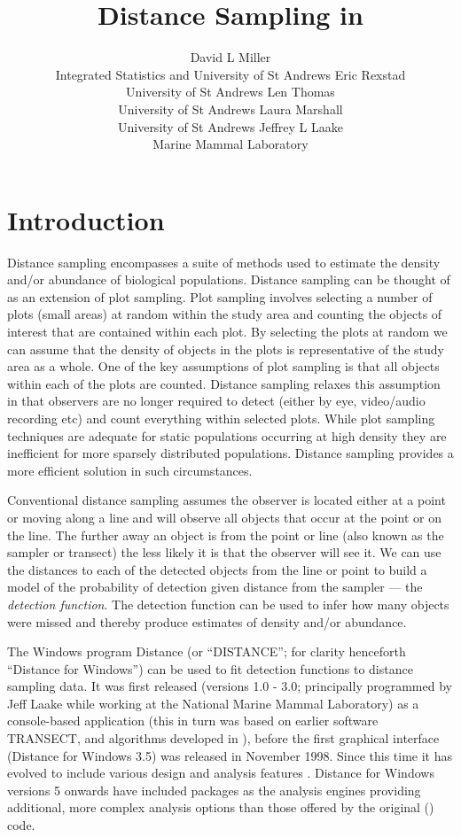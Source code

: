 \documentclass[article]{jss}\usepackage[]{graphicx}\usepackage[]{color}
\author{David L Miller\\Integrated Statistics and University of St Andrews \AND 
        Eric Rexstad\\University of St Andrews \And 
        Len Thomas\\University of St Andrews \AND 
        Laura Marshall\\University of St Andrews \And 
        Jeffrey L Laake\\Marine Mammal Laboratory}
\title{Distance Sampling in \proglang{R}}
\begin{document}
\section{Introduction}


Distance sampling \citep{Buckland:2001vm, Buckland:2004ts, buckland2015distance} encompasses a suite of methods used to estimate the density and/or abundance of biological populations. Distance sampling can be thought of as an extension of plot sampling. Plot sampling involves selecting a number of plots (small areas) at random within the study area and counting the objects of interest that are contained within each plot. By selecting the plots at random we can assume that the density of objects in the plots is representative of the study area as a whole. One of the key assumptions of plot sampling is that all objects within each of the plots are counted. Distance sampling relaxes this assumption in that observers are no longer required to detect (either by eye, video/audio recording etc) and count everything within selected plots. While plot sampling techniques are adequate for static populations occurring at high density they are inefficient for more sparsely distributed populations. Distance sampling provides a more efficient solution in such circumstances.

Conventional distance sampling assumes the observer is located either at a point or moving along a line and will observe all objects that occur at the point or on the line. The further away an object is from the point or line (also known as the sampler or transect) the less likely it is that the observer will see it. We can use the distances to each of the detected objects from the line or point to build a model of the probability of detection given distance from the sampler --- the \textit{detection function}. The detection function can be used to infer how many objects were missed and thereby produce estimates of density and/or abundance. 

The Windows program Distance (or ``DISTANCE''; for clarity henceforth ``Distance for Windows'') can be used to fit detection functions to distance sampling data. It was first released (versions 1.0 - 3.0; principally programmed by Jeff Laake while working at the National Marine Mammal Laboratory) as a console-based application (this in turn was based on earlier software TRANSECT, \citealp{Burnham:1980wz} and algorithms developed in \citealp{Buckland:1992fa}), before the first graphical interface (Distance for Windows 3.5) was released in November 1998. Since this time it has evolved to include various design and analysis features \citep{Thomas:2010cf}. Distance for Windows versions 5 onwards have included  \citep{rcore} packages as the analysis engines providing additional, more complex analysis options than those offered by the original () code.
\end{document}
